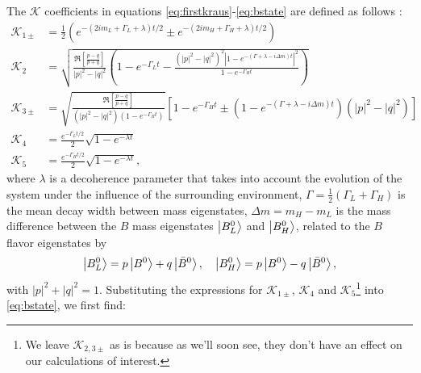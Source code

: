 The $\mathcal{K}$ coefficients in equations \ref{eq:firstkraus}-\ref{eq:bstate} are defined as follows \cite{Naikoo}:
\begin{align}
\mathcal{K}_{1\pm} &= \frac{1}{2}\left(e^{-(2im_L+\Gamma_L+\lambda)t/2}\pm e^{-(2im_H+\Gamma_H+\lambda)t/2}\right) \nonumber \\
\mathcal{K}_2 &= \sqrt{\frac{\Re\left[\frac{p-q}{p+q}\right]}{|p|^2-|q|^2}\left(1-e^{-\Gamma_L t}-\frac{(|p|^2-|q|^2)^2 |1-e^{-(\Gamma+\lambda-i\Delta m)t}|^2}{1-e^{-\Gamma_H t}}\right)} \nonumber \\
\mathcal{K}_{3\pm} &= \sqrt{\frac{\Re\left[\frac{p-q}{p+q}\right]}{(|p|^2-|q|^2)(1-e^{-\Gamma_H t})}}\left[1-e^{-\Gamma_H t}\pm(1-e^{-(\Gamma + \lambda-i\Delta m)t})(|p|^2-|q|^2)\right] \nonumber \\
\mathcal{K}_4 &= \frac{e^{-\Gamma_L t/2}}{2}\sqrt{1-e^{-\lambda t}} \nonumber \\
\mathcal{K}_5 &= \frac{e^{-\Gamma_H t/2}}{2}\sqrt{1-e^{-\lambda t}},
\end{align}
where $\lambda$ is a decoherence parameter that takes into account the evolution of the system under the influence of the surrounding environment, $\Gamma = \frac{1}{2}(\Gamma_L+\Gamma_H)$ is the mean decay width between mass eigenstates, $\Delta m = m_H-m_L$ is the mass difference between the $B$ mass eigenstates $\ket{B^0_L}$ and $\ket{B^0_H}$, related to the $B$ flavor eigenstates by
\begin{align}
\ket{B^0_L}=p\ket{B^0}+q\ket{\bar{B}^0}, \quad \ket{B_H^0}=p\ket{B^0}-q\ket{\bar{B}^0},
\end{align}
with $|p|^2 + |q|^2 = 1$. Substituting the expressions for $\mathcal{K}_{1\pm}$, $\mathcal{K}_4$ and $\mathcal{K}_5$\footnote{We leave $\mathcal{K}_{2,3\pm}$ as is because as we'll soon see, they don't have an effect on our calculations of interest.} into \ref{eq:bstate}, we first find:
